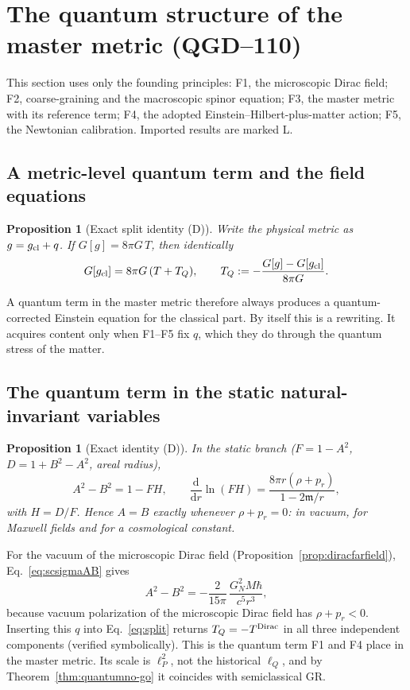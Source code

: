 \documentclass[11pt,a4paper]{article}
\newtheorem{proposition}[theorem]{Proposition}
\begin{document}
\section{The quantum structure of the master metric (QGD--110)}\label{sec:quantumstructure}
This section uses only the founding principles: F1, the microscopic Dirac field;
F2, coarse-graining and the macroscopic spinor equation; F3, the master metric
with its reference term; F4, the adopted Einstein--Hilbert-plus-matter action;
F5, the Newtonian calibration. Imported results are marked L.

\subsection{A metric-level quantum term and the field equations}
\begin{proposition}[Exact split identity (D)]\label{prop:split}
Write the physical metric as $g=g_{\rm cl}+q$. If $G[g]=8\pi G\,T$, then
identically
\begin{equation}\label{eq:split}
G[g_{\rm cl}]=8\pi G\,(T+T_Q),\qquad T_Q:=-\frac{G[g]-G[g_{\rm cl}]}{8\pi G}.
\end{equation}
\end{proposition}
\noindent A quantum term in the master metric therefore always produces a
quantum-corrected Einstein equation for the classical part. By itself this is a
rewriting. It acquires content only when F1--F5 fix $q$, which they do through the
quantum stress of the matter.

\subsection{The quantum term in the static natural-invariant variables}
\begin{proposition}[Exact identity (D)]\label{prop:ABFH}
In the static branch ($F=1-A^2$, $D=1+B^2-A^2$, areal radius),
\begin{equation}\label{eq:ABFH}
A^2-B^2=1-FH,\qquad \frac{\mathrm d}{\mathrm dr}\ln(FH)=\frac{8\pi r(\rho+p_r)}{1-2\mathfrak m/r},
\end{equation}
with $H=D/F$. Hence $A=B$ exactly whenever $\rho+p_r=0$: in vacuum, for Maxwell
fields and for a cosmological constant.
\end{proposition}
\noindent For the vacuum of the microscopic Dirac field (Proposition~\ref{prop:diracfarfield}),
Eq.~\eqref{eq:scsigmaAB} gives
\begin{equation}\label{eq:ABquantum}
A^2-B^2=-\frac{2}{15\pi}\,\frac{G_N^2M\hbar}{c^5r^3},
\end{equation}
because vacuum polarization of the microscopic Dirac field has $\rho+p_r<0$. Inserting this $q$ into
Eq.~\eqref{eq:split} returns $T_Q=-T^{\rm Dirac}$ in all three independent
components (verified symbolically). This is the quantum term F1 and F4 place in the
master metric. Its scale is $\ell_P^2$, not the historical $\ell_Q$, and by
Theorem~\ref{thm:quantumno-go} it coincides with semiclassical GR.
\end{document}
